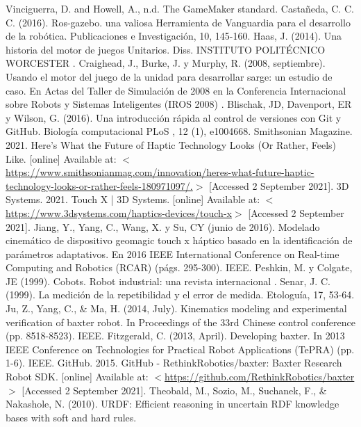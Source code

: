 \begin{thebibliography}{2}
	 Vinciguerra, D. and Howell, A., n.d. The GameMaker standard.
	 Castañeda, C. C. C. (2016). Ros-gazebo. una valiosa Herramienta de Vanguardia para el desarrollo de la robótica. Publicaciones e Investigación, 10, 145-160.
	 Haas, J. (2014). Una historia del motor de juegos Unitarios. Diss. INSTITUTO POLITÉCNICO WORCESTER .
	 Craighead, J., Burke, J. y Murphy, R. (2008, septiembre). Usando el motor del juego de la unidad para desarrollar sarge: un estudio de caso. En Actas del Taller de Simulación de 2008 en la Conferencia Internacional sobre Robots y Sistemas Inteligentes (IROS 2008) .
	 Blischak, JD, Davenport, ER y Wilson, G. (2016). Una introducción rápida al control de versiones con Git y GitHub. Biología computacional PLoS , 12 (1), e1004668.
	 Smithsonian Magazine. 2021. Here's What the Future of Haptic Technology Looks (Or Rather, Feels) Like. [online] Available at: $<$\href{https://www.smithsonianmag.com/innovation/heres-what-future-haptic-technology-looks-or-rather-feels-180971097/}{https://www.smithsonianmag.com/innovation/heres-what-future-haptic-technology-looks-or-rather-feels-180971097/.}$>$ [Accessed 2 September 2021].
	 3D Systems. 2021. Touch X | 3D Systems. [online] Available at: $<$\url{https://www.3dsystems.com/haptics-devices/touch-x}$>$ [Accessed 2 September 2021].
	 Jiang, Y., Yang, C., Wang, X. y Su, CY (junio de 2016). Modelado cinemático de dispositivo geomagic touch x háptico basado en la identificación de parámetros adaptativos. En 2016 IEEE International Conference on Real-time Computing and Robotics (RCAR) (págs. 295-300). IEEE.
	 Peshkin, M. y Colgate, JE (1999). Cobots. Robot industrial: una revista internacional .
	 Senar, J. C. (1999). La medición de la repetibilidad y el error de medida. Etologuía, 17, 53-64.
	 Ju, Z., Yang, C., \& Ma, H. (2014, July). Kinematics modeling and experimental verification of baxter robot. In Proceedings of the 33rd Chinese control conference (pp. 8518-8523). IEEE.
	 Fitzgerald, C. (2013, April). Developing baxter. In 2013 IEEE Conference on Technologies for Practical Robot Applications (TePRA) (pp. 1-6). IEEE.
	 GitHub. 2015. GitHub - RethinkRobotics/baxter: Baxter Research Robot SDK. [online] Available at: $<$\url{https://github.com/RethinkRobotics/baxter}$>$ [Accessed 2 September 2021].
	 Theobald, M., Sozio, M., Suchanek, F., \& Nakashole, N. (2010). URDF: Efficient reasoning in uncertain RDF knowledge bases with soft and hard rules.

\end{thebibliography}
